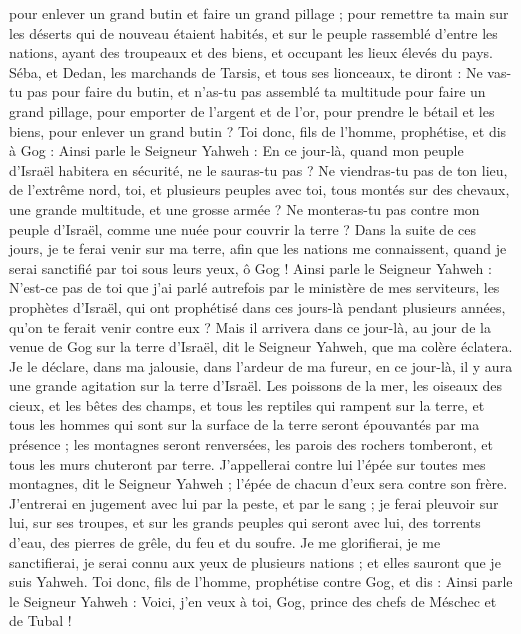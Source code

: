 \begin{multicols}{2}
pour enlever un grand butin et faire un grand pillage ; pour remettre ta main sur les déserts qui de nouveau étaient habités, et sur le peuple rassemblé d'entre les nations, ayant des troupeaux et des biens, et occupant les lieux élevés du pays.
Séba, et Dedan, les marchands de Tarsis, et tous ses lionceaux, te diront : Ne vas-tu pas pour faire du butin, et n'as-tu pas assemblé ta multitude pour faire un grand pillage, pour emporter de l'argent et de l'or, pour prendre le bétail et les biens, pour enlever un grand butin ?
Toi donc, fils de l’homme, prophétise, et dis à Gog : Ainsi parle le Seigneur Yahweh : En ce jour-là, quand mon peuple d'Israël habitera en sécurité, ne le sauras-tu pas ?
Ne viendras-tu pas de ton lieu, de l’extrême nord, toi, et plusieurs peuples avec toi, tous montés sur des chevaux, une grande multitude, et une grosse armée ?
Ne monteras-tu pas contre mon peuple d'Israël, comme une nuée pour couvrir la terre ? Dans la suite de ces jours, je te ferai venir sur ma terre, afin que les nations me connaissent, quand je serai sanctifié par toi sous leurs yeux, ô Gog !
Ainsi parle le Seigneur Yahweh : N'est-ce pas de toi que j'ai parlé autrefois par le ministère de mes serviteurs, les prophètes d'Israël, qui ont prophétisé dans ces jours-là pendant plusieurs années, qu'on te ferait venir contre eux ?
Mais il arrivera dans ce jour-là, au jour de la venue de Gog sur la terre d'Israël, dit le Seigneur Yahweh, que ma colère éclatera.
Je le déclare, dans ma jalousie, dans l'ardeur de ma fureur, en ce jour-là, il y aura une grande agitation sur la terre d'Israël.
Les poissons de la mer, les oiseaux des cieux, et les bêtes des champs, et tous les reptiles qui rampent sur la terre, et tous les hommes qui sont sur la surface de la terre seront épouvantés par ma présence ; les montagnes seront renversées, les parois des rochers tomberont, et tous les murs chuteront par terre.
J'appellerai contre lui l'épée sur toutes mes montagnes, dit le Seigneur Yahweh ; l'épée de chacun d'eux sera contre son frère.
J'entrerai en jugement avec lui par la peste, et par le sang ; je ferai pleuvoir sur lui, sur ses troupes, et sur les grands peuples qui seront avec lui, des torrents d'eau, des pierres de grêle, du feu et du soufre\FTNT{}.
Je me glorifierai, je me sanctifierai, je serai connu aux yeux de plusieurs nations ; et elles sauront que je suis Yahweh.
\VerseOne{}Toi donc, fils de l’homme, prophétise contre Gog, et dis : Ainsi parle le Seigneur Yahweh : Voici, j'en veux à toi, Gog, prince des chefs de Méschec et de Tubal !

\end{multicols}
